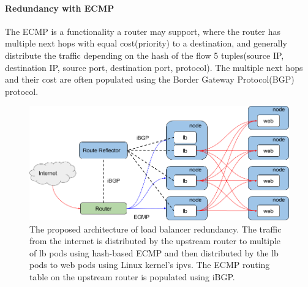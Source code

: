 \paragraph{\bf Redundancy with ECMP}

The ECMP is a functionality a router may support, where the router has multiple next hops with equal cost(priority) to a destination, and generally distribute the traffic depending on the hash of the flow 5 tuples(source IP, destination IP, source port, destination port, protocol).
The multiple next hops and their cost are often populated using the Border Gateway Protocol(BGP) protocol.

\begin{figure}[tb]
\begin{center}
\includegraphics[width=\columnwidth]{Figs/ecmp.png}
\end{center}
\caption{
  The proposed architecture of load balancer redundancy.
  The traffic from the internet is distributed by the upstream router to multiple of lb pods using hash-based ECMP and then distributed by the lb pods to web pods using Linux kernel's ipvs.
  The ECMP routing table on the upstream router is populated using iBGP.
}
\label{fig:ecmp}
\end{figure}


